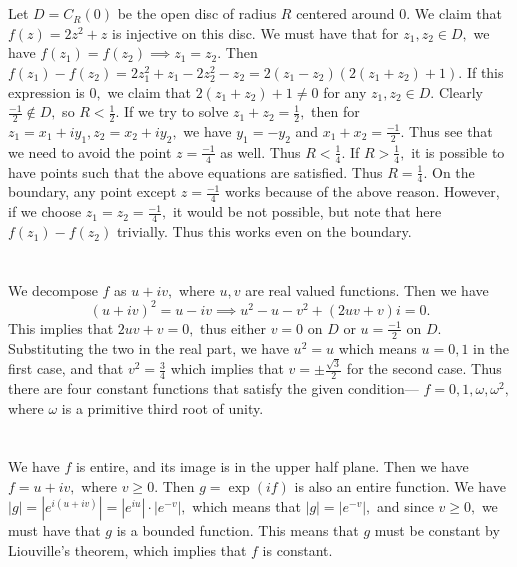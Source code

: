 \documentclass{article}
\begin{document}
\section{} %
Let $D=C_R(0)$ be the open disc of radius $R$ centered around $0.$ We claim that $f(z)=2z^2+z$ is injective on this disc. We must have that for $z_1,z_2 \in 
D,$ we have $f(z_1)=f(z_2) \implies z_1=z_2.$ Then $f(z_1)-f(z_2)= 2z_1^2+z_1 - 2z_2^2 - z_2 = 2(z_1-z_2)(2(z_1+z_2)+1).$ If this expression is $0,$ we 
claim that $2(z_1+z_2)+1 \neq 0$ for any $z_1, z_2 \in D.$ Clearly $\frac{-1}{2} \notin D,$ so $R < \frac{1}{2}.$ If we try to solve $z_1+z_2=\frac{1}{2},$ 
then for $z_1=x_1+iy_1, z_2=x_2+iy_2,$ we have $y_1=-y_2$ and $x_1+x_2=\frac{-1}{2}.$ Thus see that we need to avoid the point $z=\frac{-1}{4}$ as well. 
Thus $R < \frac{1}{4}.$ If $R>\frac{1}{4},$ it is possible to have points such that the above equations are satisfied. Thus $R=\frac{1}{4}.$ On the 
boundary, any point except $z=\frac{-1}{4}$ works because of the above reason. However, if we choose $z_1=z_2=\frac{-1}{4},$ it would be not possible, but 
note that here $f(z_1)-f(z_2)$ trivially. Thus this works even on the boundary.  
\section{} %
We decompose $f$ as $u+iv,$ where $u,v$ are real valued functions. Then we have $$(u+iv)^2=u-iv \implies u^2-u-v^2 + (2uv+v)i =0.$$
This implies that $2uv+v=0,$ thus either $v=0$ on $D$ or $u= \frac{-1}{2}$ on $D.$ Substituting the two in the real part, we have $u^2=u$ which means 
$u=0,1$ in the first case, and that $ v^2=\frac{3}{4}$ which implies that $v = \pm \frac{\sqrt{3}}{2}$ for the second case. 
Thus there are four constant functions that satisfy the given condition--- $f=0, 1, \omega, \omega^2,$ where $\omega$ is a primitive third root of unity. 
\section{} %
We have $f$ is entire, and its image is in the upper half plane. Then we have $f=u+iv,$ where $v \geq 0.$ Then $g=\exp(if)$ is also an entire function. We 
have $|g| = \left| e^{i(u +iv)} \right|= \left| e^{iu} \right| \cdot \left|e^{-v}\right|,$ which means that $|g| = \left|e^{-v}\right|,$ and since $v \geq 
0,$ we must have that $g$ is a bounded function. This means that $g$ must be constant by Liouville's theorem, which implies that $f$ is constant.  
\section{} %
\end{document}
